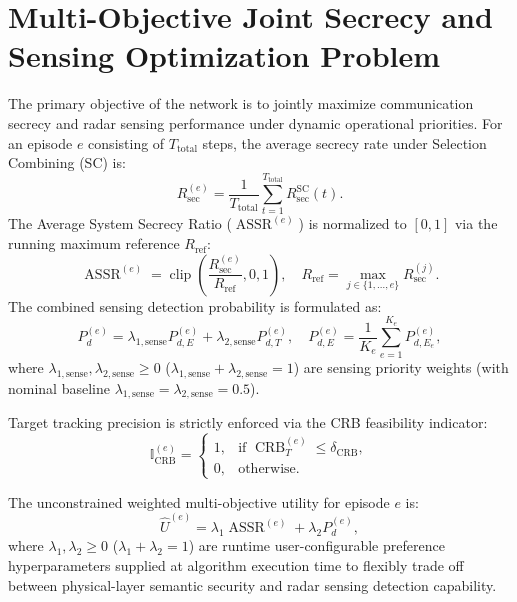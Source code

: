 \documentclass[journal,onecolumn]{IEEEtran}
\begin{document}
\section{Multi-Objective Joint Secrecy and Sensing Optimization Problem}
The primary objective of the network is to jointly maximize communication secrecy and radar sensing performance under dynamic operational priorities. For an episode $e$ consisting of $T_{\text{total}}$ steps, the average secrecy rate under Selection Combining (SC) is:
\begin{equation}
    R_{\text{sec}}^{(e)} = \frac{1}{T_{\text{total}}} \sum_{t=1}^{T_{\text{total}}} R_{\text{sec}}^{\text{SC}}(t).
\end{equation}
The Average System Secrecy Ratio ($\operatorname{ASSR}^{(e)}$) is normalized to $[0, 1]$ via the running maximum reference $R_{\text{ref}}$:
\begin{equation}
    \operatorname{ASSR}^{(e)} = \operatorname{clip}\left( \frac{R_{\text{sec}}^{(e)}}{R_{\text{ref}}}, 0, 1 \right), \quad R_{\text{ref}} = \max_{j \in \{1, \dots, e\}} R_{\text{sec}}^{(j)}.
\end{equation}
The combined sensing detection probability is formulated as:
\begin{equation}
    P_d^{(e)} = \lambda_{1,\text{sense}} P_{d, E}^{(e)} + \lambda_{2,\text{sense}} P_{d, T}^{(e)}, \quad P_{d, E}^{(e)} = \frac{1}{K_e} \sum_{e=1}^{K_e} P_{d, E_e}^{(e)},
\end{equation}
where $\lambda_{1,\text{sense}}, \lambda_{2,\text{sense}} \ge 0$ ($\lambda_{1,\text{sense}} + \lambda_{2,\text{sense}} = 1$) are sensing priority weights (with nominal baseline $\lambda_{1,\text{sense}} = \lambda_{2,\text{sense}} = 0.5$).

Target tracking precision is strictly enforced via the CRB feasibility indicator:
\begin{equation}
    \mathbb{I}_{\text{CRB}}^{(e)} =
    \begin{cases}
        1, & \text{if } \operatorname{CRB}_{T}^{(e)} \le \delta_{\text{CRB}}, \\
        0, & \text{otherwise.}
    \end{cases}
\end{equation}

The unconstrained weighted multi-objective utility for episode $e$ is:
\begin{equation}
    \widehat{U}^{(e)} = \lambda_1 \operatorname{ASSR}^{(e)} + \lambda_2 P_d^{(e)},
\end{equation}
where $\lambda_1, \lambda_2 \ge 0$ ($\lambda_1 + \lambda_2 = 1$) are runtime user-configurable preference hyperparameters supplied at algorithm execution time to flexibly trade off between physical-layer semantic security and radar sensing detection capability.
\end{document}
